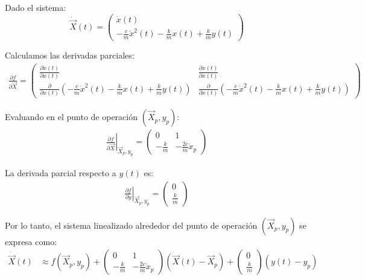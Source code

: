 \documentclass[
  11pt,
  letterpaper,
   addpoints,
   answers
  ]{exam}
\begin{document}
\begin{questions}
\begin{solution}
Dado el sistema:
\begin{equation}
  \dot{\vec{X}}(t) = \begin{pmatrix} \dot{x}(t) \\ -\frac{c}{m} \dot{x}^2(t) - \frac{k}{m} x(t) + \frac{k}{m} y(t) \end{pmatrix}
\end{equation}

Calculamos las derivadas parciales:
\begin{align}
  \frac{\partial f}{\partial \vec{X}} =
  \begin{pmatrix}
    \frac{\partial \dot{x}(t)}{\partial x(t)} & \frac{\partial \dot{x}(t)}{\partial \dot{x}(t)} \\
    \frac{\partial}{\partial x(t)}\left(-\frac{c}{m} \dot{x}^2(t) - \frac{k}{m} x(t) + \frac{k}{m} y(t)\right) & \frac{\partial}{\partial \dot{x}(t)}\left(-\frac{c}{m} \dot{x}^2(t) - \frac{k}{m} x(t) + \frac{k}{m} y(t)\right)
  \end{pmatrix}
\end{align}

Evaluando en el punto de operación $\left(\vec{X}_p, y_p\right)$:
\begin{align}
  \left.\frac{\partial f}{\partial \vec{X}}\right|_{\vec{X}_p, y_p} =
  \begin{pmatrix}
    0 & 1 \\
    -\frac{k}{m} & -\frac{2c}{m} \dot{x}_p
  \end{pmatrix}
\end{align}

La derivada parcial respecto a $y(t)$ es:
\begin{align}
  \left.\frac{\partial f}{\partial y}\right|_{\vec{X}_p, y_p} = \begin{pmatrix} 0 \\ \frac{k}{m} \end{pmatrix}
\end{align}

Por lo tanto, el sistema linealizado alrededor del punto de operación $\left(\vec{X}_p, y_p\right)$ se expresa como:
\begin{align}
  \dot{\vec{X}}(t) &\approx f(\vec{X}_p, y_p) +
  \begin{pmatrix}
    0 & 1 \\
    -\frac{k}{m} & -\frac{2c}{m} \dot{x}_p
  \end{pmatrix}
  (\vec{X}(t) - \vec{X}_p) +
  \begin{pmatrix} 0 \\ \frac{k}{m} \end{pmatrix} (y(t) - y_p)
\end{align}


\end{solution}
\end{questions}
\end{document}
